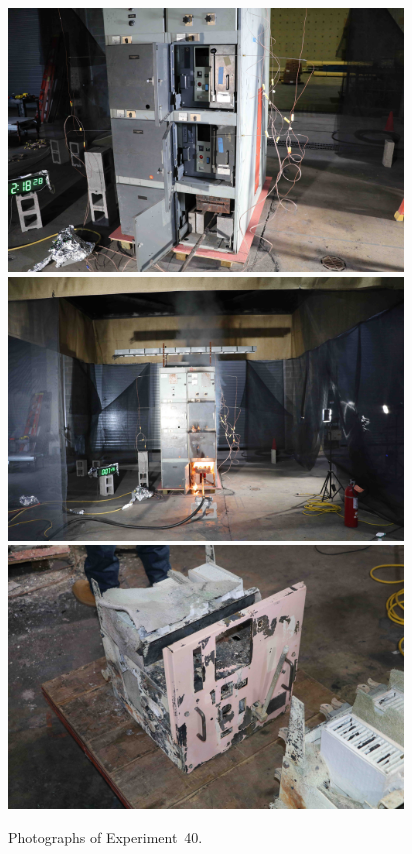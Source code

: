 \documentclass[12pt]{article}
\begin{document}
\begin{figure}[p]
\centering
\includegraphics[height=2.75in]{../FIGURES/Test_40_setup} \\
\includegraphics[height=2.75in]{../FIGURES/Test_40_7_min_26_s} \\
\includegraphics[height=2.75in]{../FIGURES/Test_40_breaker}
\caption[Photographs of Experiment~40]{Photographs of Experiment~40.}
\label{fig:Test_40_photos}
\end{figure}


\clearpage
\end{document}
